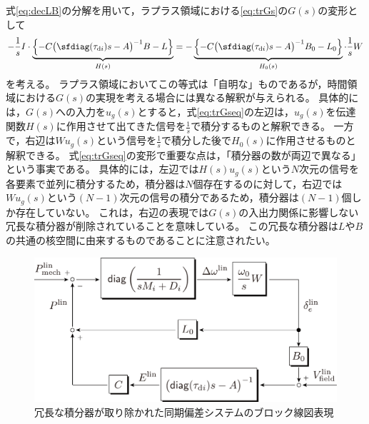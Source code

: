 \documentclass[tombow,dvipdfmx]{corona-a5}
\begin{document}
式\ref{eq:decLB}の分解を用いて，ラプラス領域における\eqref{eq:trGs}の$G(s)$の変形として
\begin{align}\label{eq:trGseq}
- \frac{1}{s} I \cdot
\underbrace{
\left\{ -C \bigl( \sfdiag(\tau_{{\rm d}i})s -A \bigr)^{-1} B - L \right\}
}_{H(s)}
=
- 
\underbrace{
\left\{ -C \bigl( \sfdiag(\tau_{{\rm d}i})s -A \bigr)^{-1} B_0 - L_0 \right\} 
}_{H_0(s)}
\cdot
\frac{1}{s} W
\end{align}
を考える。
ラプラス領域においてこの等式は「自明な」ものであるが，時間領域における$G(s)$の実現を考える場合には異なる解釈が与えられる。
具体的には，$G(s)$への入力を$u_g(s)$とすると，式\ref{eq:trGseq}の左辺は，$u_g(s)$を伝達関数$H(s)$に作用させて出てきた信号を$\frac{1}{s}$で積分するものと解釈できる。
一方で，右辺は$W u_g(s)$という信号を$\frac{1}{s}$で積分した後で$H_0(s)$に作用させるものと解釈できる。
式\ref{eq:trGseq}の変形で重要な点は，「積分器の数が両辺で異なる」という事実である。
具体的には，左辺では$H(s) u_g(s)$という$N$次元の信号を各要素で並列に積分するため，積分器は$N$個存在するのに対して，右辺では$W u_g(s)$という$(N-1)$次元の信号の積分であるため，積分器は$(N-1)$個しか存在していない。
これは，右辺の表現では$G(s)$の入出力関係に影響しない冗長な積分器が削除されていることを意味している。
この冗長な積分器は$L$や$B$の共通の核空間に由来するものであることに注意されたい。


\begin{figure}[t]
\centering
\includegraphics[width = .50\linewidth]{figs/blocklinsysnew}
\caption{冗長な積分器が取り除かれた同期偏差システムのブロック線図表現}
\label{fig:blocklinnew}
\end{figure}
\end{document}

